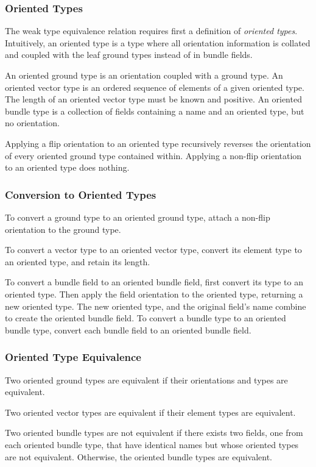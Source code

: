 \documentclass[12pt]{article}
\begin{document}
\subsubsection{Oriented Types}
The weak type equivalence relation requires first a definition of {\em oriented types}. Intuitively, an oriented type is a type where all orientation information is collated and coupled with the leaf ground types instead of in bundle fields.

An oriented ground type is an orientation coupled with a ground type. An oriented vector type is an ordered sequence of elements of a given oriented type. The length of an oriented vector type must be known and positive. An oriented bundle type is a collection of fields containing a name and an oriented type, but no orientation.

Applying a flip orientation to an oriented type recursively reverses the orientation of every oriented ground type contained within. Applying a non-flip orientation to an oriented type does nothing.

\subsubsection{Conversion to Oriented Types}
To convert a ground type to an oriented ground type, attach a non-flip orientation to the ground type. 

To convert a vector type to an oriented vector type, convert its element type to an oriented type, and retain its length. 

To convert a bundle field to an oriented bundle field, first convert its type to an oriented type. Then apply the field orientation to the oriented type, returning a new oriented type. The new oriented type, and the original field's name combine to create the oriented bundle field. To convert a bundle type to an oriented bundle type, convert each bundle field to an oriented bundle field.

\subsubsection{Oriented Type Equivalence}
Two oriented ground types are equivalent if their orientations and types are equivalent.

Two oriented vector types are equivalent if their element types are equivalent.

Two oriented bundle types are not equivalent if there exists two fields, one from each oriented bundle type, that have identical names but whose oriented types are not equivalent. Otherwise, the oriented bundle types are equivalent.
\end{document}
